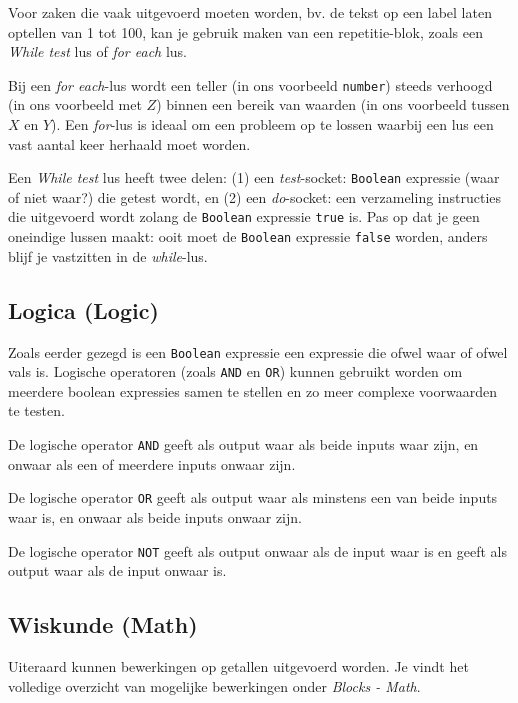 Voor zaken die vaak uitgevoerd moeten worden, bv. de tekst op een label laten optellen van 1 tot 100, kan je gebruik maken van een repetitie-blok, zoals een \emph{While test} lus of \emph{for each} lus.


Bij een \emph{for each}-lus wordt een teller (in ons voorbeeld \texttt{number}) steeds verhoogd (in ons voorbeeld met $Z$) binnen een bereik van waarden (in ons voorbeeld tussen $X$ en $Y$). Een \emph{for}-lus is ideaal om een probleem op te lossen waarbij een lus een vast aantal keer herhaald moet worden.

Een \emph{While test} lus heeft twee delen: (1) een \emph{test}-socket: \texttt{Boolean} expressie (waar of niet waar?) die getest wordt, en (2) een \emph{do}-socket: een verzameling instructies die uitgevoerd wordt zolang de \texttt{Boolean} expressie \texttt{true} is. Pas op dat je geen oneindige lussen maakt: ooit moet de \texttt{Boolean} expressie \texttt{false} worden, anders blijf je vastzitten in de \emph{while}-lus.

\subsection{Logica (Logic)}

Zoals eerder gezegd is een \texttt{Boolean} expressie een expressie die ofwel waar of ofwel vals is.
Logische operatoren (zoals \texttt{AND} en \texttt{OR}) kunnen gebruikt worden om meerdere boolean expressies samen te stellen en zo meer complexe voorwaarden te testen. 

De logische operator \texttt{AND} geeft als output waar als beide inputs waar zijn, en onwaar als een of meerdere inputs onwaar zijn. 

De logische operator \texttt{OR} geeft als output waar als minstens een van beide inputs waar is, en onwaar als beide inputs onwaar zijn.

De logische operator \texttt{NOT} geeft als output onwaar als de input waar is en geeft als output waar als de input onwaar is.

\subsection{Wiskunde (Math)}
Uiteraard kunnen bewerkingen op getallen uitgevoerd worden. Je vindt het volledige overzicht van mogelijke bewerkingen onder \emph{Blocks - Math}.

